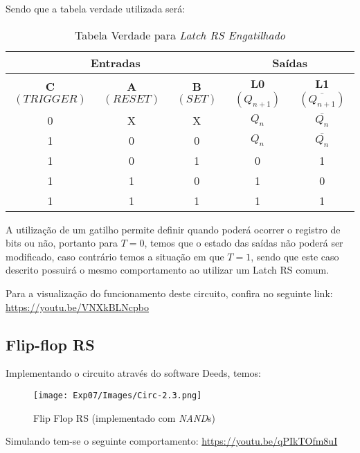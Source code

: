 \documentclass[12pt]{article}
\begin{document}
Sendo que a tabela verdade utilizada será:
\begin{table}[H]
    \centering
    \caption{Tabela Verdade para \emph{Latch RS Engatilhado}}
    \begin{tabular}{|c|c|c||c|c|}\hline
      \multicolumn{3}{|c||}{Entradas} & \multicolumn{2}{|c|}{Saídas} \\\hline
      \textbf{C $({TRIGGER})$} & \textbf{A $({RESET})$} & \textbf{B $({SET})$} & \textbf{L0 $(Q_{n+1})$} & \textbf{L1 $(\overline{Q_{n+1}})$} \\\hline
      0 & X & X & $Q_{n}$ & $\overline{Q_{n}}$ \\\hline
      1 & 0 & 0 & $Q_{n}$ & $\overline{Q_{n}}$\\\hline
      1 & 0 & 1 & 0 & 1\\\hline
      1 & 1 & 0 & 1 & 0 \\\hline
      1 & 1 & 1 & 1 & 1 \\\hline
    \end{tabular}\label{tab:truth_table_latch_rs_triggered}
\end{table}

A utilização de um gatilho permite definir quando poderá ocorrer o registro de
bits ou não, portanto para $T=0$, temos que o estado das saídas não poderá ser
modificado, caso contrário temos a situação em que $T=1$, sendo que este caso
descrito possuirá o mesmo comportamento ao utilizar um Latch RS comum.

Para a visualização do funcionamento deste circuito, confira no seguinte link:
\href{https://youtu.be/VNXkBLNcpbo}{https://youtu.be/VNXkBLNcpbo}

\subsection{Flip-flop RS}\label{sec:2.3}

Implementando o circuito através do software Deeds, temos:
\begin{figure}[H]
  \centering
  \texttt{[image: Exp07/Images/Circ-2.3.png]}
  \caption{Flip Flop RS (implementado com \emph{NAND}s)}\label{fig:Flip-Flop-RS.png}
\end{figure}

Simulando tem-se o seguinte comportamento:
\href{https://youtu.be/qPIkTOfm8uI}{https://youtu.be/qPIkTOfm8uI}
\end{document}

